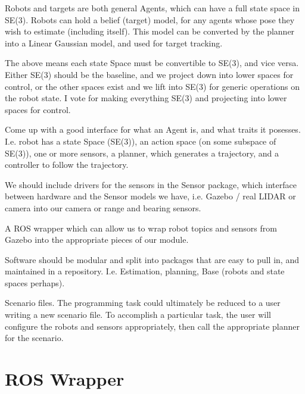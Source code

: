 \begin{DoxyItemize}
\item Robots and targets are both general \textquotesingle{}Agents\textquotesingle{}, which can have a full state space in S\+E(3). Robots can hold a belief (target) model, for any agents whose pose they wish to estimate (including itself). This model can be converted by the planner into a Linear Gaussian model, and used for target tracking.
\item The above means each state Space must be convertible to S\+E(3), and vice versa. Either S\+E(3) should be the baseline, and we project down into lower spaces for control, or the other spaces exist and we lift into S\+E(3) for generic operations on the robot state. I vote for making everything S\+E(3) and projecting into lower spaces for control.
\item Come up with a good interface for what an Agent is, and what traits it posesses. I.\+e. robot has a state Space (S\+E(3)), an action space (on some subspace of S\+E(3)), one or more sensors, a planner, which generates a trajectory, and a controller to follow the trajectory.
\item We should include drivers for the sensors in the Sensor package, which interface between hardware and the Sensor models we have, i.\+e. Gazebo / real L\+I\+D\+AR or camera into our camera or range and bearing sensors.
\item A R\+OS wrapper which can allow us to wrap robot topics and sensors from Gazebo into the appropriate pieces of our module.
\item Software should be modular and split into packages that are easy to pull in, and maintained in a repository. I.\+e. Estimation, planning, Base (robots and state spaces perhaps).
\item Scenario files. The programming task could ultimately be reduced to a user writing a new scenario file. To accomplish a particular task, the user will configure the robots and sensors appropriately, then call the appropriate planner for the scenario.
\end{DoxyItemize}

\section*{R\+OS Wrapper}


